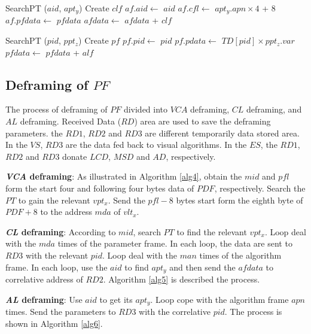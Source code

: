 \documentclass[journal,UTF8]{IEEEtran}
\begin{document}
\begin{algorithm}
	\label{alg2}
	\caption{$CLFraming$}%
	SearchPT ($aid$, $apt_y$)\;
	Create $clf$\;
	$af.aid\leftarrow$ $aid$\;
	$af.cfl \leftarrow$ $apt_y.apn \times 4$ + 8\;
	$af.pfdata \leftarrow$ $pfdata$\;	
	$afdata\leftarrow$ $afdata$ + $clf$\;	 
\end{algorithm}
\begin{algorithm}
	\label{alg3}
	\caption{$ALFraming$}%
	SearchPT ($pid$, $ppt_z$)\;
	Create $pf$\;
	$pf.pid\leftarrow$ $pid$\; %
	$pf.pdata \leftarrow$ $TD[pid]\times ppt_z.var$\;
	$pfdata\leftarrow$ $pfdata$ + $alf$\;	 
\end{algorithm}

\subsection{Deframing of $PF$}
 The process of deframing of $PF$ divided into $VCA$ deframing, $CL$ deframing, and $AL$ deframing. Received Data ($RD$) area are used to save the deframing parameters. the $RD1$, $RD2$ and $RD3$ are different temporarily data stored area. In the $VS$, $RD3$ are the data fed back to visual algorithms. In the $ES$, the $RD1$, $RD2$ and $RD3$ donate $LCD$, $MSD$ and $AD$, respectively.

\textbf{\emph{VCA} deframing}: As illustrated in Algorithm \ref{alg4}, obtain the $mid$ and $pfl$ form the start four and following four bytes data of $PDF$, respectively. Search the $PT$ to gain the relevant $vpt_x$. Send the $pfl-8$ bytes start form the eighth byte of $PDF+8$ to the address $mda$ of $vlt_x$.

\textbf{\emph{CL} deframing}: According to $mid$, search $PT$ to find the relevant $vpt_x$. Loop deal with the $mda$ times of the parameter frame. In each loop, the data are sent to $RD3$ with the relevant $pid$. Loop deal with the $man$ times of the algorithm frame. In each loop, use the $aid$ to find $apt_y$ and then send the $afdata$ to correlative address of $RD2$. Algorithm \ref{alg5} is described the process.

\textbf{\emph{AL} deframing}: Use $aid$ to get its $apt_y$. Loop cope with the algorithm frame $apn$ times. Send the parameters to $RD3$ with the correlative $pid$. The process is shown in Algorithm \ref{alg6}.
\end{document}

